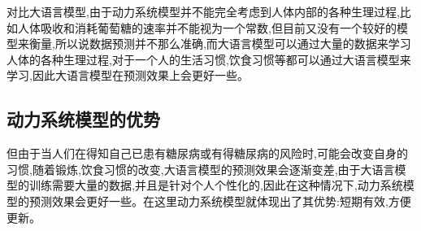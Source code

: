     对比大语言模型,由于动力系统模型并不能完全考虑到人体内部的各种生理过程,比如人体吸收和消耗葡萄糖的速率并不能视为一个常数,但目前又没有一个较好的模型来衡量,所以说数据预测并不那么准确,而大语言模型可以通过大量的数据来学习人体的各种生理过程,对于一个人的生活习惯,饮食习惯等都可以通过大语言模型来学习,因此大语言模型在预测效果上会更好一些。

    \subsection*{动力系统模型的优势}

    但由于当人们在得知自己已患有糖尿病或有得糖尿病的风险时,可能会改变自身的习惯,随着锻炼,饮食习惯的改变,大语言模型的预测效果会逐渐变差,由于大语言模型的训练需要大量的数据,并且是针对个人个性化的,因此在这种情况下,动力系统模型的预测效果会更好一些。在这里动力系统模型就体现出了其优势:短期有效,方便更新。
